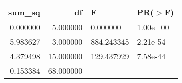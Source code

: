 \begin{tabular}{rrll}
\toprule
sum\_sq & df & F & PR($>$F) \\
\midrule
0.000000 & 5.000000 & 0.000000 & 1.00e+00 \\
5.983627 & 3.000000 & 884.243345 & 2.21e-54 \\
4.379498 & 15.000000 & 129.437929 & 7.58e-44 \\
0.153384 & 68.000000 &  &  \\
\bottomrule
\end{tabular}
